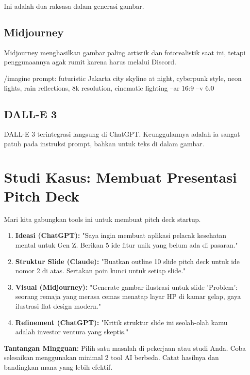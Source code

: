 Ini adalah dua raksasa dalam generasi gambar.

\subsection{Midjourney}
Midjourney menghasilkan gambar paling artistik dan fotorealistik saat ini, tetapi penggunaannya agak rumit karena harus melalui Discord.

\begin{codeblock}[title=Contoh Prompt Midjourney]
/imagine prompt: futuristic Jakarta city skyline at night, cyberpunk style, neon lights, rain reflections, 8k resolution, cinematic lighting --ar 16:9 --v 6.0
\end{codeblock}

\subsection{DALL-E 3}
DALL-E 3 terintegrasi langsung di ChatGPT. Keunggulannya adalah ia sangat patuh pada instruksi prompt, bahkan untuk teks di dalam gambar.

\section{Studi Kasus: Membuat Presentasi Pitch Deck}

Mari kita gabungkan tools ini untuk membuat pitch deck startup.

\begin{enumerate}
    \item \textbf{Ideasi (ChatGPT):} "Saya ingin membuat aplikasi pelacak kesehatan mental untuk Gen Z. Berikan 5 ide fitur unik yang belum ada di pasaran."
    \item \textbf{Struktur Slide (Claude):} "Buatkan outline 10 slide pitch deck untuk ide nomor 2 di atas. Sertakan poin kunci untuk setiap slide."
    \item \textbf{Visual (Midjourney):} "Generate gambar ilustrasi untuk slide 'Problem': seorang remaja yang merasa cemas menatap layar HP di kamar gelap, gaya ilustrasi flat design modern."
    \item \textbf{Refinement (ChatGPT):} "Kritik struktur slide ini seolah-olah kamu adalah investor ventura yang skeptis."
\end{enumerate}

\begin{exercisebox}
\textbf{Tantangan Mingguan:}
Pilih satu masalah di pekerjaan atau studi Anda. Coba selesaikan menggunakan minimal 2 tool AI berbeda. Catat hasilnya dan bandingkan mana yang lebih efektif.
\end{exercisebox}

